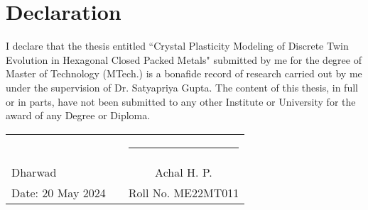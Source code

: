\chapter*{\centering Declaration}
  {\fontsize{14}{16}\selectfont   
  I declare that the thesis entitled ``Crystal Plasticity Modeling of Discrete Twin Evolution in Hexagonal Closed Packed Metals" submitted by me for the degree of Master of Technology (MTech.) is a bonafide record of research carried out by me under the supervision of Dr. Satyapriya Gupta. The content of this thesis, in full or in parts, have not been submitted to any other Institute or University for the award of any Degree or Diploma.}

  \vskip 2cm 

  \begin{tabular}{p{5cm} p{4cm} c}
    & & \rule{6cm}{1sp} \\
    {\fontsize{14}{16}\selectfont Dharwad}& & {\fontsize{14}{16}\selectfont Achal H. P.} \\
    {\fontsize{14}{16}\selectfont Date: 20 May 2024} & & {\fontsize{14}{16}\selectfont Roll No. ME22MT011} \\
  \end{tabular}
